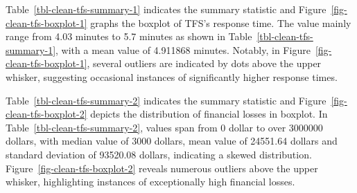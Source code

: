 \documentclass[
  letterpaper,
  DIV=11,
  numbers=noendperiod]{scrartcl}
\begin{document}
Table~\ref{tbl-clean-tfs-summary-1} indicates the summary statistic and
Figure~\ref{fig-clean-tfs-boxplot-1} graphs the boxplot of TFS's
response time. The value mainly range from 4.03 minutes to 5.7 minutes
as shown in Table~\ref{tbl-clean-tfs-summary-1}, with a mean value of
4.911868 minutes. Notably, in Figure~\ref{fig-clean-tfs-boxplot-1},
several outliers are indicated by dots above the upper whisker,
suggesting occasional instances of significantly higher response times.

Table~\ref{tbl-clean-tfs-summary-2} indicates the summary statistic and
Figure~\ref{fig-clean-tfs-boxplot-2} depicts the distribution of
financial losses in boxplot. In Table~\ref{tbl-clean-tfs-summary-2},
values span from 0 dollar to over 3000000 dollars, with median value of
3000 dollars, mean value of 24551.64 dollars and standard deviation of
93520.08 dollars, indicating a skewed distribution.
Figure~\ref{fig-clean-tfs-boxplot-2} reveals numerous outliers above the
upper whisker, highlighting instances of exceptionally high financial
losses.
\end{document}
